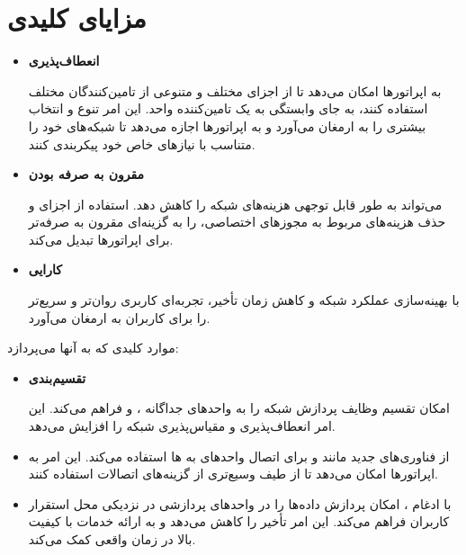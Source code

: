 \documentclass[landscape, 12pt]{report}
\begin{document}
\section*{مزایای کلیدی
	}
 \begin{itemize}
 	\item
\textbf{انعطاف‌پذیری
}

 	به اپراتورها امکان می‌دهد تا از اجزای مختلف و متنوعی از تامین‌کنندگان مختلف استفاده کنند، به جای وابستگی به یک تامین‌کننده واحد. این امر تنوع و انتخاب بیشتری را به ارمغان می‌آورد و به اپراتورها اجازه می‌دهد تا شبکه‌های خود را متناسب با نیازهای خاص خود پیکربندی کنند.
 	\item
 \textbf{مقرون به صرفه بودن}
 
 	 می‌تواند به طور قابل توجهی هزینه‌های شبکه را کاهش دهد. استفاده از اجزای
 	  و حذف هزینه‌های مربوط به مجوزهای اختصاصی، 
 	  را به گزینه‌ای مقرون به صرفه‌تر برای اپراتورها تبدیل می‌کند.
 	  \item 
\textbf{کارایی}

  با بهینه‌سازی عملکرد شبکه و کاهش زمان تأخیر، تجربه‌ای کاربری روان‌تر و سریع‌تر را برای کاربران به ارمغان می‌آورد.
  \end{itemize}
 	موارد کلیدی که
 	  به آنها می‌پردازد:
 	  \begin{itemize}
 	  	\item 
\textbf{تقسیم‌بندی
 }
 
  امکان تقسیم وظایف پردازش شبکه را به واحدهای جداگانه 
  ،
    و
      فراهم می‌کند. این امر انعطاف‌پذیری و مقیاس‌پذیری شبکه را افزایش می‌دهد.
 	  	\item 
\textbf{ }
	
 	  	 از فناوری‌های 
 	  	  جدید مانند 
 	  	   و 
 	  	    برای اتصال واحدهای
 	  	     به 
 	  	     ها استفاده می‌کند. این امر به اپراتورها امکان می‌دهد تا از طیف وسیع‌تری از گزینه‌های اتصالات استفاده کنند.
 	  	\item 
 	  	\textbf{}
 	  	
 	  	 با ادغام
 	  	 ، امکان پردازش داده‌ها را در واحدهای پردازشی در نزدیکی محل استقرار کاربران فراهم می‌کند. این امر تأخیر را کاهش می‌دهد و به ارائه خدمات با کیفیت بالا در زمان واقعی کمک می‌کند.
 	  \end{itemize}
\end{document}
